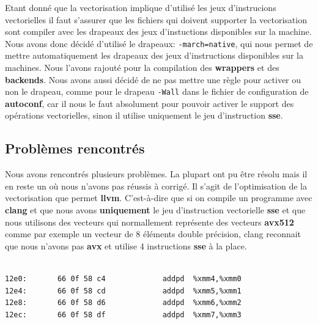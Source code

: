 \documentclass[11pt]{article}
\begin{document}
Etant donné que la vectorisation implique d'utilisé les jeux d'instrucions
vectorielles il faut s'assurer que les fichiers qui doivent supporter la
vectorisation sont compiler avec les drapeaux des jeux d'instuctions
disponibles sur la machine.
\vspace{5mm}
Nous avons donc décidé d'utilisé le drapeaux: \texttt{-march=native}, qui nous
permet de mettre automatiquement les drapeaux des jeux d'instructions
disponibles sur la machines.
\vspace{5mm}
Nous l'avons rajouté pour la compilation des \textbf{wrappers} et des \textbf{backends}.
\vspace{5mm}
Nous avons aussi décidé de ne pas mettre une règle pour activer ou non le
drapeau, comme pour le drapeau \texttt{-Wall} dans le fichier de configuration de
\textbf{autoconf}, car il nous le faut absolument pour pouvoir activer le support
des opérations vectorielles, sinon il utilise uniquement le jeu d'instruction
\textbf{sse}.

\subsection{Problèmes rencontrés}
\label{sec:org0f4013c}

Nous avons rencontrés plusieurs problèmes. La plupart ont pu être résolu mais
il en reste un où nous n'avons pas réussis à corrigé. Il s'agit de
l'optimisation de la vectorisation que permet \textbf{llvm}.
\vspace{5mm}
C'est-à-dire que si on compile un programme avec \textbf{clang} et que nous avons
\textbf{uniquement} le jeu d'instruction vectorielle \textbf{sse} et que nous utilisons des
vecteurs qui normallement représente des vecteurs \textbf{avx512} comme par exemple un
vecteur de 8 éléments double précision, clang reconnait que nous n'avons pas
\textbf{avx} et utilise 4 instructions \textbf{sse} à la place.

\begin{verbatim}

12e0:       66 0f 58 c4             addpd  %xmm4,%xmm0
12e4:       66 0f 58 cd             addpd  %xmm5,%xmm1
12e8:       66 0f 58 d6             addpd  %xmm6,%xmm2
12ec:       66 0f 58 df             addpd  %xmm7,%xmm3

\end{verbatim}
\end{document}
